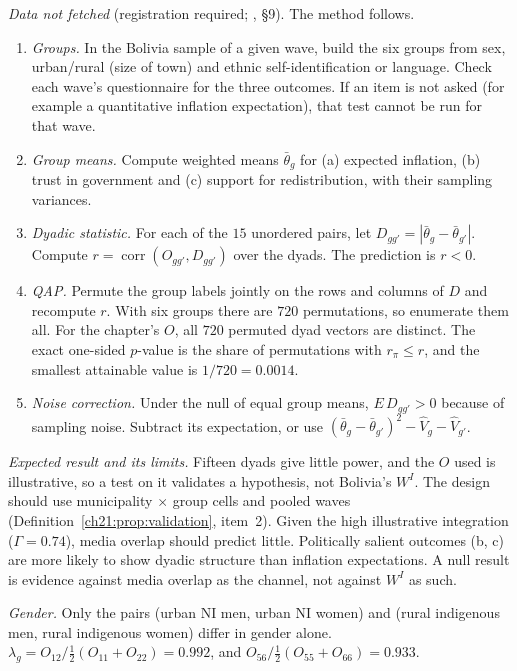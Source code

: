\documentclass[../solutions_manual.tex]{subfiles}
\begin{document}
\emph{Data not fetched} (registration required; , \S9). The method follows.
\begin{enumerate}
\item \emph{Groups.} In the Bolivia sample of a given wave, build the six groups from sex, urban/rural (size of town) and ethnic self-identification or language. Check each wave's questionnaire for the three outcomes. If an item is not asked (for example a quantitative inflation expectation), that test cannot be run for that wave.
\item \emph{Group means.} Compute weighted means $\bar\theta_g$ for (a) expected inflation, (b) trust in government and (c) support for redistribution, with their sampling variances.
\item \emph{Dyadic statistic.} For each of the $15$ unordered pairs, let $D_{gg'} = |\bar\theta_g - \bar\theta_{g'}|$. Compute $r = \operatorname{corr}(O_{gg'}, D_{gg'})$ over the dyads. The prediction is $r < 0$.
\item \emph{QAP.} Permute the group labels jointly on the rows and columns of $D$ and recompute $r$. With six groups there are $720$ permutations, so enumerate them all. For the chapter's $O$, all $720$ permuted dyad vectors are distinct. The exact one-sided $p$-value is the share of permutations with $r_\pi \le r$, and the smallest attainable value is $1/720 = 0.0014$.
\item \emph{Noise correction.} Under the null of equal group means, $E\,D_{gg'} > 0$ because of sampling noise. Subtract its expectation, or use $(\bar\theta_g - \bar\theta_{g'})^2 - \hat V_g - \hat V_{g'}$.
\end{enumerate}
\emph{Expected result and its limits.} Fifteen dyads give little power, and the $O$ used is illustrative, so a test on it validates a hypothesis, not Bolivia's $W^I$. The design should use municipality $\times$ group cells and pooled waves (Definition~\ref{ch21:prop:validation}, item~2). Given the high illustrative integration ($\Gamma = 0.74$), media overlap should predict little. Politically salient outcomes (b, c) are more likely to show dyadic structure than inflation expectations. A null result is evidence against media overlap as the channel, not against $W^I$ as such.


 \emph{Gender.} Only the pairs (urban NI men, urban NI women) and (rural indigenous men, rural indigenous women) differ in gender alone. $\lambda_g = O_{12}/\tfrac12(O_{11} + O_{22}) = 0.992$, and $O_{56}/\tfrac12(O_{55} + O_{66}) = 0.933$.
\end{document}
